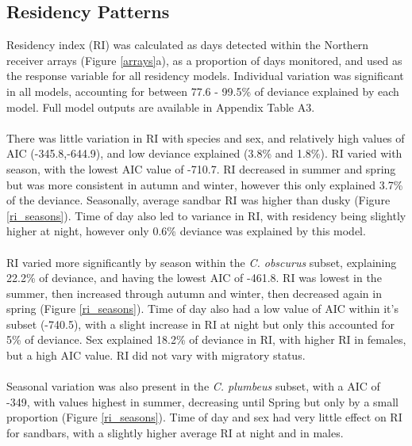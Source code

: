 \documentclass[11pt,a4paper]{article}
\begin{document}
	
	
	
	
	\subsection{Residency Patterns}
	
	Residency index (RI) was calculated as days detected within the Northern receiver arrays (Figure \ref{arrays}a), as a proportion of days monitored, and used as the response variable for all residency models. Individual variation was significant in all models, accounting for between 77.6 - 99.5\% of deviance explained by each model. Full model outputs are available in Appendix Table A3.\\
	\\
	There was little variation in RI with species and sex, and relatively high values of AIC (-345.8,-644.9), and low deviance explained (3.8\% and 1.8\%). RI varied with season, with the lowest AIC value of -710.7. RI decreased in summer and spring but was more consistent in autumn and winter, however this only explained 3.7\% of the deviance. Seasonally, average sandbar RI was higher than dusky (Figure \ref{ri_seasons}). Time of day also led to variance in RI, with residency being slightly higher at night, however only 0.6\% deviance was explained by this model.\\
	\\
	RI varied more significantly by season within the \textit{C. obscurus} subset, explaining 22.2\% of deviance, and having the lowest AIC of -461.8. RI was lowest in the summer, then increased through autumn and winter, then decreased again in spring (Figure \ref{ri_seasons}). Time of day also had a low value of AIC within it's subset (-740.5), with a slight increase in RI at night but only this accounted for 5\% of deviance. Sex explained 18.2\% of deviance in RI, with higher RI in females, but a high AIC value. RI did not vary with migratory status. \\
	\\
	Seasonal variation was also present in the \textit{C. plumbeus} subset, with a AIC of -349, with values highest in summer, decreasing until Spring but only by a small proportion (Figure \ref{ri_seasons}). Time of day and sex had very little effect on RI for sandbars, with a slightly higher average RI at night and in males.
	
\end{document}
